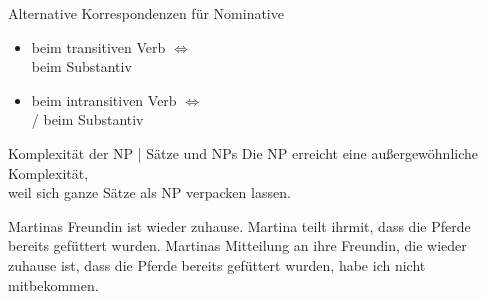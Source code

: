 \begin{frame}
  {Alternative Korrespondenzen für Nominative}
  \pause
  \begin{exe}
    \ex\label{ex:rektionundvalenzindernp035}
    \begin{xlist}
      \pause
    \end{xlist}
  \end{exe}
  \pause
  \begin{itemize}[<+->]
    \item {} beim transitiven Verb $\Leftrightarrow$\\
       beim Substantiv
  \end{itemize}
  \pause
  \Halbzeile
  \begin{exe}
    \pause
    \pause
    \pause
  \end{exe}
  \pause
  \begin{itemize}[<+->]
    \item {} beim intransitiven Verb $\Leftrightarrow$\\
      \slash{} beim Substantiv
  \end{itemize}
\end{frame}


\begin{frame}
  {Komplexität der NP | Sätze und NPs}
  \onslide<+->
  \onslide<+->
  Die NP erreicht eine außergewöhnliche Komplexität,\\
  weil sich ganze Sätze als NP verpacken lassen.\\
  \onslide<+->
  \Zeile
  \begin{exe}
    \ex Martinas Freundin ist wieder zuhause. Martina teilt ihrmit, dass die Pferde bereits gefüttert wurden.
    \ex Martinas Mitteilung an ihre Freundin, die wieder zuhause ist, dass die Pferde bereits gefüttert wurden, habe ich nicht mitbekommen.
  \end{exe}
\end{frame}


